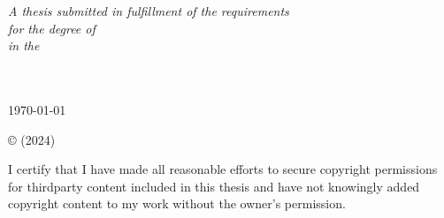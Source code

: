 \documentclass[
11pt, %
english, %
singlespacing, %
headsepline, %
]{MastersDoctoralThesis} %
\begin{document}
\begin{titlepage}
\begin{center}
\vfill

\large \textit{A thesis submitted in fulfillment of the requirements\\ for the degree of \degreename}\\[0.3cm] %
\textit{in the}\\[0.4cm]
\groupname\\\deptname\\[2cm] %
 
\vfill

{\large \today}\\[4cm] %
 
\vfill
\end{center}
\end{titlepage}

\begin{copyright}
	
	© \authorname  (2024)
	
	I certify that I have made all reasonable efforts to secure copyright permissions for thirdparty content included in this thesis and have not knowingly added copyright content
to my work without the owner’s permission.
	
\end{copyright}

\end{document}
